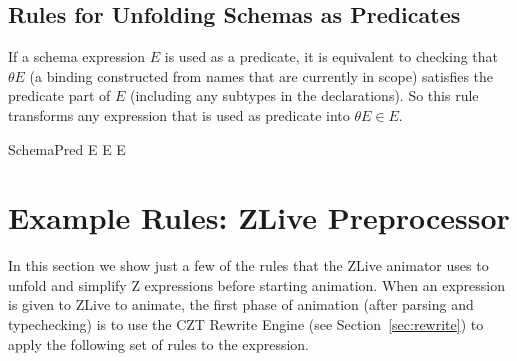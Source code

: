 \documentclass{entcs}
\newcommand{\sexprUnfoldsTo}{\mathrel{=_{se}}}
\newcommand{\schemaEquals}{\mathrel{=_S}}
\begin{document}




%


\subsection{Rules for Unfolding Schemas as Predicates}

If a schema expression $E$ is used as a predicate, it is equivalent to
checking that $\theta E$ (a binding constructed from names that are
currently in scope) satisfies the predicate part of $E$ 
(including any subtypes in the declarations).  So this rule
transforms any expression that is used as predicate into $\theta E \in E$.
\begin{zedrule}{SchemaPred}
  E \iff \theta E \in E
\end{zedrule}


\section{Example Rules: ZLive Preprocessor} \label{sec:zlive}

In this section we show just a few of the rules that the ZLive
animator uses to unfold and simplify Z expressions before starting
animation.  When an expression is given to ZLive to animate, the first
phase of animation (after parsing and typechecking) is to use the CZT
Rewrite Engine (see Section~\ref{sec:rewrite}) to apply the following
set of rules to the expression.
\end{document}
